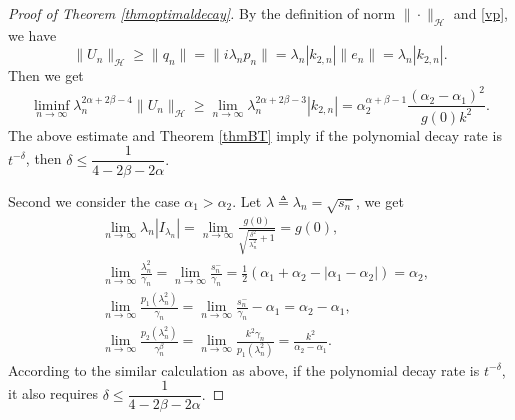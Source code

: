\documentclass[12pt,reqno]{article}
\begin{document}
\begin{proof}[Proof of Theorem \ref{thmoptimaldecay}]
By the definition of norm $\|\cdot\|_{\mathcal{H}}$ and \eqref{vp}, we have
\[
\|U_n\|_{\mathcal{H}}\ge\|q_n\|=\|i\lambda_n p_n\|=\lambda_n|k_{2,n}|\|e_n\|=\lambda_n|k_{2,n}|.
\]
Then we get
\begin{equation*}
	\liminf_{n\to\infty}\lambda_n^{2\alpha+2\beta-4}\|U_n\|_{\mathcal{H}}\ge \lim_{n\to\infty}\lambda_n^{2\alpha+2\beta-3}|k_{2,n}|=\alpha_2^{\alpha+\beta-1}\frac{(\alpha_2-\alpha_1)^2}{g(0)k^2}.
\end{equation*}
The above estimate and Theorem \ref{thmBT} imply if the polynomial decay rate is $t^{-\delta}$,  then $\delta\le\dfrac{1}{4-2\beta-2\alpha}.$

Second we consider the case $\alpha_1>\alpha_2. $
Let $\lambda\triangleq\lambda_n=\sqrt{s_n^-}$, we get
\begin{align*}
	&\lim_{n\to\infty}\lambda_n|I_{\lambda_n}|=\lim_{n\to\infty}\frac{g(0)}{\sqrt{\frac{\delta^2}{\lambda_n^2}+1}}=g(0),\\
	&\lim_{n\to\infty}\frac{\lambda_n^2}{\gamma_n}=\lim_{n\to\infty}\frac{s_n^-}{\gamma_n}=\frac12\left(\alpha_1+\alpha_2-|\alpha_1-\alpha_2|\right)=\alpha_2,\\
	&\lim_{n\to\infty}\frac{p_1(\lambda_n^2)}{\gamma_n}=\lim_{n\to\infty}\frac{s_n^-}{\gamma_n}-\alpha_1=\alpha_2-\alpha_1,\\
	&\lim_{n\to\infty}\frac{p_2(\lambda_n^2)}{\gamma_n^\beta}=\lim_{n\to\infty}\frac{k^2\gamma_n}{p_1(\lambda_n^2)}=\frac{k^2}{\alpha_2-\alpha_1}.
\end{align*}
According to the similar calculation as above, if the polynomial decay rate is $t^{-\delta}$, it also requires $\delta\le\dfrac{1}{4-2\beta-2\alpha}.$\end{proof}
\end{document}

